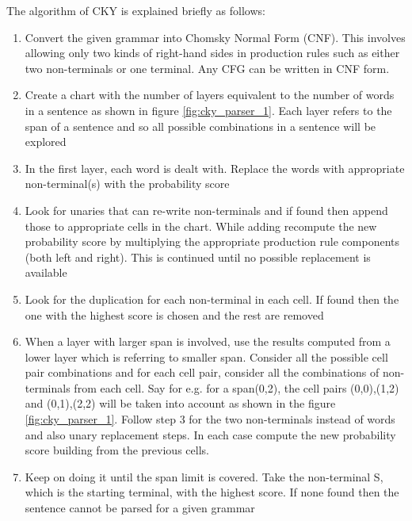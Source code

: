 \documentclass[a4paper, 11pt]{article}
\begin{document}
The algorithm of CKY is explained briefly as follows: 
\begin{enumerate}
\item Convert the given grammar into  Chomsky Normal Form (CNF). This involves allowing only two kinds of right-hand sides in production rules such as either two non-terminals or one terminal. Any CFG can be written in CNF form.
\item Create a chart with the number of layers equivalent to the number of words in a sentence as shown in figure \ref{fig:cky_parser_1}. Each layer refers to the span of a sentence and so all possible combinations in a sentence will be explored
\item In the first layer, each word is dealt with. Replace the words with appropriate non-terminal(s) with the probability score
\item Look for unaries that can re-write non-terminals and if found then append those to appropriate cells in the chart. While adding recompute the new probability score by multiplying the appropriate production rule components (both left and right). This is continued until no possible replacement is available 
\item Look for the duplication for each non-terminal in each cell. If found then the one with the highest score is chosen and the rest are removed
\item When a layer with larger span is involved, use the results computed from a lower layer which is referring to smaller span. Consider all the possible cell pair combinations and for each cell pair, consider all the combinations of non-terminals from each cell. Say for e.g. for a span(0,2), the cell pairs {(0,0),(1,2)} and {(0,1),(2,2)} will be taken into account as shown in the figure \ref{fig:cky_parser_1}. Follow step 3 for the two non-terminals instead of words and also unary replacement steps. In each case compute the new probability score building from the previous cells. 
\item Keep on doing it until the span limit is covered. Take the non-terminal S, which is the starting terminal, with the highest score. If none found then the sentence cannot be parsed for a given grammar
\end{enumerate}
\end{document}
